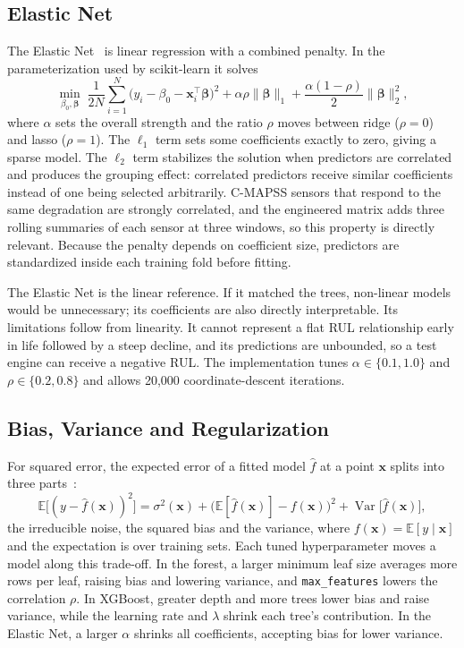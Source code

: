 \subsection{Elastic Net}
The Elastic Net~\cite{Zou2005regularization} is linear regression with a
combined penalty. In the parameterization used by scikit-learn it solves
\begin{equation}
    \min_{\beta_0,\boldsymbol{\beta}}\;
    \frac{1}{2N}\sum_{i=1}^{N}\bigl(y_i-\beta_0-\mathbf{x}_i^{\top}\boldsymbol{\beta}\bigr)^2
    +\alpha\rho\lVert\boldsymbol{\beta}\rVert_1
    +\frac{\alpha(1-\rho)}{2}\lVert\boldsymbol{\beta}\rVert_2^2 ,
\end{equation}
where $\alpha$ sets the overall strength and the ratio $\rho$ moves between
ridge ($\rho=0$) and lasso ($\rho=1$). The $\ell_1$ term sets some coefficients
exactly to zero, giving a sparse model. The $\ell_2$ term stabilizes the
solution when predictors are correlated and produces the grouping effect:
correlated predictors receive similar coefficients instead of one being
selected arbitrarily. C-MAPSS sensors that respond to the same degradation are
strongly correlated, and the engineered matrix adds three rolling summaries of
each sensor at three windows, so this property is directly relevant. Because
the penalty depends on coefficient size, predictors are standardized inside
each training fold before fitting.

The Elastic Net is the linear reference. If it matched the trees, non-linear
models would be unnecessary; its coefficients are also directly interpretable.
Its limitations follow from linearity. It cannot represent a flat RUL
relationship early in life followed by a steep decline, and its predictions
are unbounded, so a test engine can receive a negative RUL. The implementation
tunes $\alpha\in\{0.1,1.0\}$ and $\rho\in\{0.2,0.8\}$ and allows 20,000
coordinate-descent iterations.

\subsection{Bias, Variance and Regularization}
For squared error, the expected error of a fitted model $\hat{f}$ at a point
$\mathbf{x}$ splits into three parts~\cite{Geman1992neural,Hastie2009elements}:
\begin{equation}
    \mathbb{E}\bigl[(y-\hat{f}(\mathbf{x}))^2\bigr]
    =\sigma^2(\mathbf{x})
    +\bigl(\mathbb{E}[\hat{f}(\mathbf{x})]-f(\mathbf{x})\bigr)^2
    +\operatorname{Var}\bigl[\hat{f}(\mathbf{x})\bigr],
\end{equation}
the irreducible noise, the squared bias and the variance, where
$f(\mathbf{x})=\mathbb{E}[y\mid\mathbf{x}]$ and the expectation is over training
sets. Each tuned hyperparameter moves a model along this trade-off.
In the forest, a larger minimum leaf size averages more rows per leaf, raising
bias and lowering variance, and \texttt{max\_features} lowers the correlation
$\rho$. In XGBoost, greater depth and more trees lower bias and raise variance,
while the learning rate and $\lambda$ shrink each tree's contribution. In the
Elastic Net, a larger $\alpha$ shrinks all coefficients, accepting bias for
lower variance.

